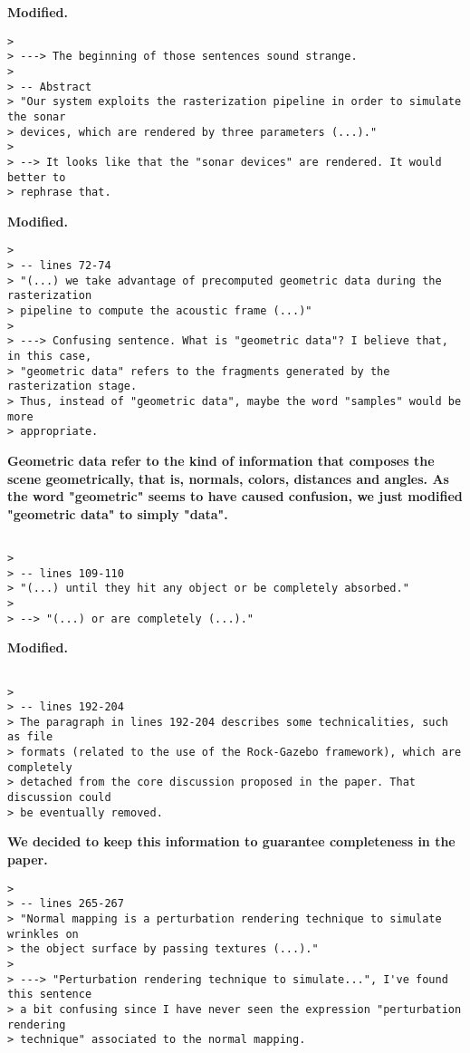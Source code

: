 \documentclass{article}
\begin{document}
\textbf{Modified.}

\begin{verbatim}
>
> ---> The beginning of those sentences sound strange.
>
> -- Abstract
> "Our system exploits the rasterization pipeline in order to simulate the sonar
> devices, which are rendered by three parameters (...)."
>
> --> It looks like that the "sonar devices" are rendered. It would better to
> rephrase that.
\end{verbatim}

\textbf{Modified.}

\begin{verbatim}
>
> -- lines 72-74
> "(...) we take advantage of precomputed geometric data during the rasterization
> pipeline to compute the acoustic frame (...)"
>
> ---> Confusing sentence. What is "geometric data"? I believe that, in this case,
> "geometric data" refers to the fragments generated by the rasterization stage.
> Thus, instead of "geometric data", maybe the word "samples" would be more
> appropriate.
\end{verbatim}

\textbf{Geometric data refer to the kind of information that composes the scene geometrically, that is, normals, colors, distances and angles. As the word "geometric" seems to have caused confusion, we just modified "geometric data" to simply "data".}

\begin{verbatim}

>
> -- lines 109-110
> "(...) until they hit any object or be completely absorbed."
>
> --> "(...) or are completely (...)."

\end{verbatim}

\textbf{Modified.}

\begin{verbatim}

>
> -- lines 192-204
> The paragraph in lines 192-204 describes some technicalities, such as file
> formats (related to the use of the Rock-Gazebo framework), which are completely
> detached from the core discussion proposed in the paper. That discussion could
> be eventually removed.
\end{verbatim}

\textbf{We decided to keep this information to guarantee completeness in the paper.}

\begin{verbatim}
>
> -- lines 265-267
> "Normal mapping is a perturbation rendering technique to simulate wrinkles on
> the object surface by passing textures (...)."
>
> ---> "Perturbation rendering technique to simulate...", I've found this sentence
> a bit confusing since I have never seen the expression "perturbation rendering
> technique" associated to the normal mapping.
\end{verbatim}
\end{document}

